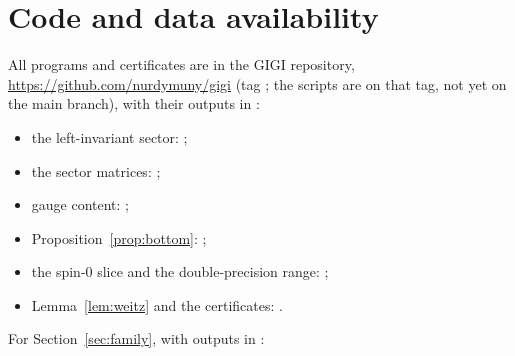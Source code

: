 \documentclass[11pt]{article}
\theoremstyle{definition}
\theoremstyle{remark}
\newif\ifredline
\newcommand{\redins}[1]{\ifredline{\color{blue}#1}\else#1\fi}
\newcommand{\reddel}[1]{\ifredline{\color{red}\sout{#1}}\fi}
\begin{document}
\section*{Code and data availability}
All programs and certificates are in the \textsc{GIGI} repository,
\url{https://github.com/nurdymuny/gigi} (tag \texttt{\reddel{floor-theorem-v2}}; the scripts are on that tag, not yet on the main branch), with their outputs in
:
\begin{itemize}
  \item the left-invariant sector: ;
  \item the sector matrices: ;
  \item gauge content: ;
  \item Proposition~\ref{prop:bottom}: ;
  \item the spin-$0$ slice and the double-precision range: ;
  \item Lemma~\ref{lem:weitz} and the certificates: .
\end{itemize}
For Section~\ref{sec:family}, with outputs in :
\end{document}
